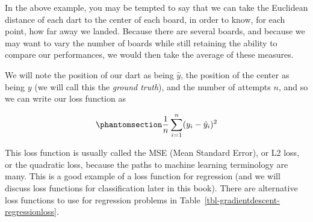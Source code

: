 \documentclass[
  letterpaper,
]{scrbook}
\begin{document}
In the above example, you may be tempted to say that we can take the
Euclidean distance of each dart to the center of each board, in order to
know, for each point, how far away we landed. Because there are several
boards, and because we may want to vary the number of boards while still
retaining the ability to compare our performances, we would then take
the average of these measures.

We will note the position of our dart as being \(\hat y\), the position
of the center as being \(y\) (we will call this the \emph{ground
truth}), and the number of attempts \(n\), and so we can write our loss
function as

\begin{equation}\phantomsection\label{eq-loss-mse}{
\frac{1}{n}\sum_{i=1}^{n}(y_i - \hat y_i)^2
}\end{equation}


This loss function is usually called the MSE (Mean Standard Error), or
L2 loss, or the quadratic loss, because the paths to machine learning
terminology are many. This is a good example of a loss function for
regression (and we will discuss loss functions for classification later
in this book). There are alternative loss functions to use for
regression problems in Table~\ref{tbl-gradientdescent-regressionloss}.
\end{document}
